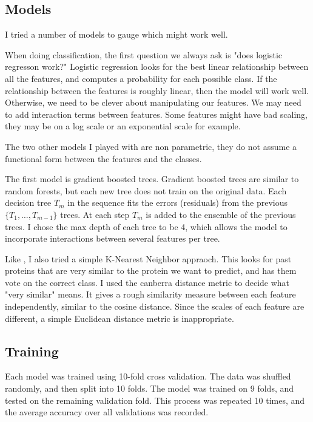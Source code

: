 \documentclass{bioinfo}
\begin{document}
\subsection{Models}

I tried a number of models to gauge which might work well.

When doing classification, the first question we always ask is "does logistic regresson work?"
Logistic regression looks for the best linear relationship between all the features, and computes a probability for each possible class.
If the relationship between the features is roughly linear, then the model will work well.
Otherwise, we need to be clever about manipulating our features.
We may need to add interaction terms between features.
Some features might have bad scaling, they may be on a log scale or an exponential scale for example.

The two other models I played with are non parametric, they do not assume a functional form between the features and the classes.

The first model is gradient boosted trees.
Gradient boosted trees are similar to random forests, but each new tree does not train on the original data.
Each decision tree $T_m$ in the sequence fits the errors (residuals) from the previous $\{T_1,\dots,T_{m-1}\}$ trees.
At each step $T_m$ is added to the ensemble of the previous trees.
I chose the max depth of each tree to be 4, which allows the model to incorporate interactions between several features per tree.

Like \cite{gao_prediction_2005}, I also tried a simple K-Nearest Neighbor appraoch.
This looks for past proteins that are very similar to the protein we want to predict, and has them vote on the correct class.
I used the canberra distance metric to decide what "very similar" means.
It gives a rough similarity measure between each feature independently, similar to the cosine distance.
Since the scales of each feature are different, a simple Euclidean distance metric is inappropriate.

\subsection{Training}

Each model was trained using 10-fold cross validation.
The data was shuffled randomly, and then split into 10 folds.
The model was trained on 9 folds, and tested on the remaining validation fold.
This process was repeated 10 times, and the average accuracy over all validations was recorded.
\end{document}
